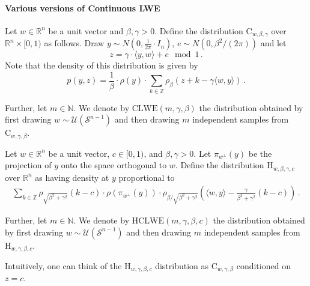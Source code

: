 \documentclass{theoretics}
\newcommand{\Paren}[1]{\left(#1\right)}
\newcommand{\iprod}[1]{\langle#1\rangle}
\newcommand{\Z}{\mathbb Z}
\newcommand{\N}{\mathbb N}
\newcommand{\R}{\mathbb R}
\newcommand{\cS}{\mathcal S}
\newcommand{\cU}{\mathcal U}
\newcommand{\clwed}[3]{\mathrm{C}_{#1,#2,#3}}
\newcommand{\hclwed}[4]{\mathrm{H}_{#1,#2,#3,#4}}
\newcommand{\clwem}[3]{\mathrm{CLWE}\Paren{#1,#2,#3}}
\newcommand{\hclwem}[4]{\mathrm{HCLWE}\Paren{#1,#2,#3,#4}}
\begin{document}
\paragraph{Various versions of Continuous LWE}

\begin{definition}
    \label{def:clwe_distribution}
    Let $w \in \R^n$ be a unit vector and $\beta, \gamma > 0$.
    Define the distribution $\clwed{w}{\beta}{\gamma}$ over $\R^n \times [0,1)$ as follows.
    Draw $y \sim N(0,\tfrac 1 {2\pi} \cdot I_n)$, $e \sim N(0,\beta^2/(2\pi))$ and let \[z = \gamma \cdot \iprod{y,w} + e \mod 1\,.\]
    Note that the density of this distribution is given by \[p(y, z) = \frac{1}{\beta} \cdot \rho \Paren{y} \cdot \sum_{k \in \Z} \rho_\beta \Paren{z + k - \gamma \iprod{w, y}} \,.\]

    Further, let $m \in\N$.
    We denote by $\clwem{m}{\gamma}{\beta}$ the distribution obtained by first drawing $w \sim \cU(\cS^{n-1})$ and then drawing $m$ independent samples from $\clwed{w}{\gamma}{\beta}$.
\end{definition}

\begin{definition}
    \label{def:hclwe_distribution}
    Let $w \in \R^n$ be a unit vector, $c \in [0,1)$, and $\beta, \gamma > 0$.
    Let $\pi_{{w}^\perp}(y)$ be the projection of $y$ onto the space orthogonal to $w$.
    Define the distribution $\hclwed{w}{\beta}{\gamma}{c}$ over $\R^n$ as having density at $y$ proportional to
    \begin{align}
        \sum_{k \in \Z} \rho_{\sqrt{\beta^2 + \gamma^2}}(k - c) \cdot \rho\Paren{\pi_{{w}^\perp}(y)} \cdot \rho_{\beta / \sqrt{\beta^2 + \gamma^2}}\Paren{\iprod{w, y} - \tfrac{\gamma}{\beta^2 + \gamma^2} (k-c) }\,. \label{eq:hclwe}
    \end{align}

    Further, let $m \in\N$.
    We denote by $\hclwem{m}{\gamma}{\beta}{c}$ the distribution obtained by first drawing $w \sim \cU(\cS^{n-1})$ and then drawing $m$ independent samples from $\hclwed{w}{\gamma}{\beta}{c}$.
\end{definition}
Intuitively, one can think of the $\hclwed{w}{\gamma}{\beta}{c}$ distribution as $\clwed{w}{\gamma}{\beta}$ conditioned on $z = c$.
\end{document}
